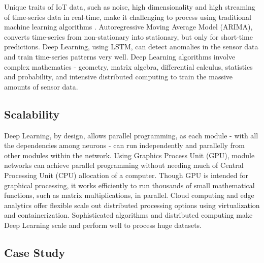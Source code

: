 \documentclass[sigconf]{acmart}
\begin{document}
	Unique traits of IoT data, such as noise, high dimensionality and high streaming of time-series data in real-time, make it challenging to process using traditional machine learning algorithms \cite{Sampathkumar2016}. Autoregressive Moving Average Model (ARIMA), converts time-series from non-stationary into stationary, but only for short-time predictions. Deep Learning, using LSTM, can detect anomalies in the sensor data and train time-series patterns very well. Deep Learning algorithms involve complex mathematics - geometry, matrix algebra, differential calculus, statistics and probability, and intensive distributed computing to train the massive amounts of sensor data.
	
	\subsection{Scalability}
	
	Deep Learning, by design, allows parallel programming, as each module - with all the dependencies among neurons - can run independently and parallelly from other modules within the network. Using Graphics Process Unit (GPU), module networks can achieve parallel programming without needing much of Central Processing Unit (CPU) allocation of a computer. Though GPU is intended for graphical processing, it works efficiently to run thousands of small mathematical functions, such as matrix multiplications, in parallel. Cloud computing and edge analytics offer flexible scale out distributed processing options using virtualization and containerization. Sophisticated algorithms and distributed computing make Deep Learning scale and perform well to process huge datasets. 
	
	\subsection{Case Study}
	
\end{document}
